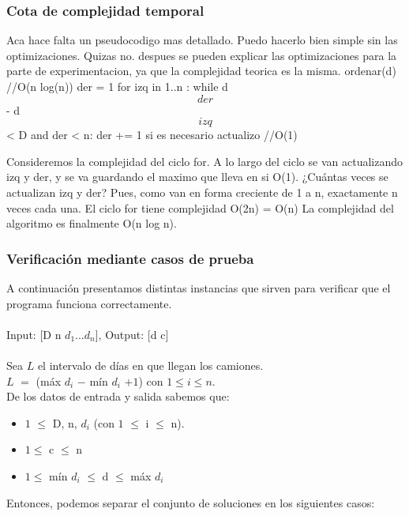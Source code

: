\documentclass[11pt, a4paper, twoside]{article}
\begin{document}
\subsubsection{Cota de complejidad temporal}
Aca hace falta un pseudocodigo mas detallado. Puedo hacerlo bien simple sin las optimizaciones. Quizas no. despues se pueden explicar las optimizaciones para la parte de experimentacion, ya que la complejidad teorica es la misma.
ordenar(d) //O(n log(n))
der = 1
for izq in 1..n :
    while d\[der\] - d\[izq\] < D and der < n:
        der += 1
    si es necesario actualizo //O(1)

Consideremos la complejidad del ciclo for. A lo largo del ciclo se van actualizando izq y der, y se va guardando el maximo que lleva  en si O(1).
¿Cuántas veces se actualizan izq y der? Pues, como van en forma creciente de 1 a n, exactamente n veces cada una. El ciclo for tiene complejidad O(2n) = O(n)
La complejidad del algoritmo es finalmente O(n log n).

\subsubsection{Verificación mediante casos de prueba}

A continuación presentamos distintas instancias que sirven para verificar que el programa funciona correctamente. \\ 
\\
Input: [D n $d_1$...$d_n$], Output: [d c] \\
\\
Sea $L$ el intervalo de días en que llegan los camiones. \\
$L$ $=$ (máx $d_i$ $-$ mín $d_i$ $+ 1$) con $1 \le i \le n$. \\

De los datos de entrada y salida sabemos que: 

\begin{itemize}
    \item $1$ $\le$ D, n, $d_i$ (con $1$ $\le$ i $\le$ n).
	\item $1 \le $ c $\le$ n 
	\item $1 \le $ mín $d_i$ $\le$ d $\le$ máx $d_i$ 
\end{itemize}

Entonces, podemos separar el conjunto de soluciones en los siguientes casos: \\
\end{document}
